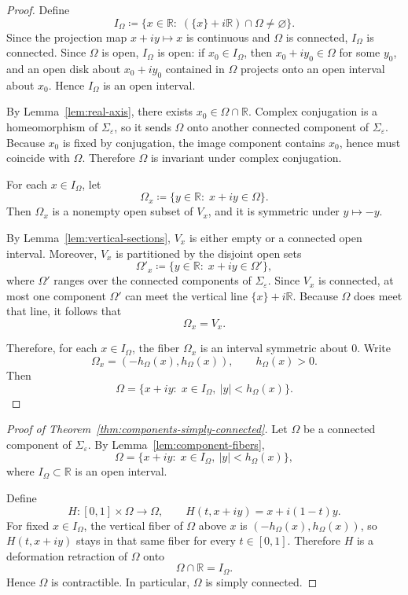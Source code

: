 \documentclass[11pt]{article}
\begin{document}
\begin{proof}
Define
\[
I_\Omega
\coloneqq
\{x\in\mathbb R:\; (\{x\}+i\mathbb R)\cap\Omega\neq\varnothing\}.
\]
Since the projection map \(x+iy\mapsto x\) is continuous and \(\Omega\) is connected,
\(I_\Omega\) is connected. Since \(\Omega\) is open, \(I_\Omega\) is open: if
\(x_0\in I_\Omega\), then \(x_0+iy_0\in\Omega\) for some \(y_0\), and an open disk
about \(x_0+iy_0\) contained in \(\Omega\) projects onto an open interval about \(x_0\).
Hence \(I_\Omega\) is an open interval.

By Lemma~\ref{lem:real-axis}, there exists \(x_0\in\Omega\cap\mathbb R\).
Complex conjugation is a homeomorphism of \(\Sigma_\varepsilon\), so it sends \(\Omega\)
onto another connected component of \(\Sigma_\varepsilon\). Because \(x_0\) is fixed by
conjugation, the image component contains \(x_0\), hence must coincide with \(\Omega\).
Therefore \(\Omega\) is invariant under complex conjugation.

For each \(x\in I_\Omega\), let
\[
\Omega_x
\coloneqq
\{y\in\mathbb R:\; x+iy\in\Omega\}.
\]
Then \(\Omega_x\) is a nonempty open subset of \(V_x\), and it is symmetric under
\(y\mapsto -y\).

By Lemma~\ref{lem:vertical-sections}, \(V_x\) is either empty or a connected open interval.
Moreover, \(V_x\) is partitioned by the disjoint open sets
\[
\Omega'_x\coloneqq \{y\in\mathbb R:\; x+iy\in\Omega'\},
\]
where \(\Omega'\) ranges over the connected components of \(\Sigma_\varepsilon\).
Since \(V_x\) is connected, at most one component \(\Omega'\) can meet the vertical line
\(\{x\}+i\mathbb R\). Because \(\Omega\) does meet that line, it follows that
\[
\Omega_x=V_x.
\]

Therefore, for each \(x\in I_\Omega\), the fiber \(\Omega_x\) is an interval symmetric
about \(0\). Write
\[
\Omega_x=(-h_\Omega(x),h_\Omega(x)),
\qquad h_\Omega(x)>0.
\]
Then
\[
\Omega
=
\{x+iy:\; x\in I_\Omega,\ |y|<h_\Omega(x)\}.
\]
\end{proof}

\begin{proof}[Proof of Theorem~\ref{thm:components-simply-connected}]
Let \(\Omega\) be a connected component of \(\Sigma_\varepsilon\). By Lemma~\ref{lem:component-fibers},
\[
\Omega
=
\{x+iy:\; x\in I_\Omega,\ |y|<h_\Omega(x)\},
\]
where \(I_\Omega\subset\mathbb R\) is an open interval.

Define
\[
H:[0,1]\times\Omega\longrightarrow\Omega,
\qquad
H(t,x+iy)=x+i(1-t)y.
\]
For fixed \(x\in I_\Omega\), the vertical fiber of \(\Omega\) above \(x\) is
\((-h_\Omega(x),h_\Omega(x))\), so \(H(t,x+iy)\) stays in that same fiber for every
\(t\in[0,1]\). Therefore \(H\) is a deformation retraction of \(\Omega\) onto
\[
\Omega\cap\mathbb R=I_\Omega.
\]
Hence \(\Omega\) is contractible. In particular, \(\Omega\) is simply connected.
\end{proof}
\end{document}
